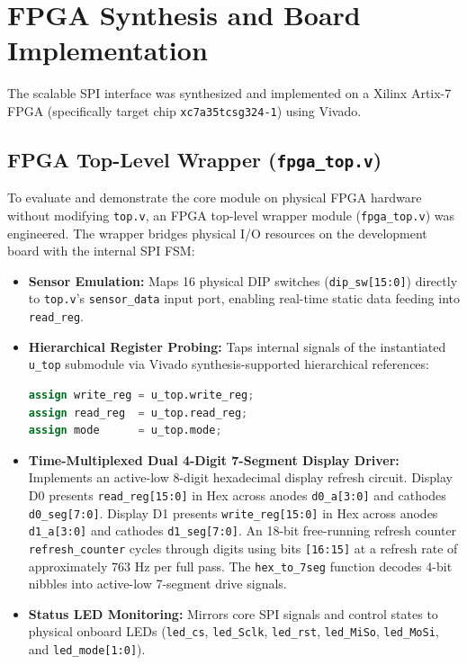 \documentclass[conference]{IEEEtran}
\begin{document}
\section{FPGA Synthesis and Board Implementation}
The scalable SPI interface was synthesized and implemented on a Xilinx Artix-7 FPGA (specifically target chip \texttt{xc7a35tcsg324-1}) using Vivado.

\subsection{FPGA Top-Level Wrapper (\texttt{fpga\_top.v})}
To evaluate and demonstrate the core module on physical FPGA hardware without modifying \texttt{top.v}, an FPGA top-level wrapper module (\texttt{fpga\_top.v}) was engineered. The wrapper bridges physical I/O resources on the development board with the internal SPI FSM:
\begin{itemize}
    \item \textbf{Sensor Emulation:} Maps 16 physical DIP switches (\texttt{dip\_sw[15:0]}) directly to \texttt{top.v}'s \texttt{sensor\_data} input port, enabling real-time static data feeding into \texttt{read\_reg}.
    \item \textbf{Hierarchical Register Probing:} Taps internal signals of the instantiated \texttt{u\_top} submodule via Vivado synthesis-supported hierarchical references:
    \begin{lstlisting}[language=Verilog]
assign write_reg = u_top.write_reg;
assign read_reg  = u_top.read_reg;
assign mode      = u_top.mode;
    \end{lstlisting}
    \item \textbf{Time-Multiplexed Dual 4-Digit 7-Segment Display Driver:} Implements an active-low 8-digit hexadecimal display refresh circuit. Display D0 presents \texttt{read\_reg[15:0]} in Hex across anodes \texttt{d0\_a[3:0]} and cathodes \texttt{d0\_seg[7:0]}. Display D1 presents \texttt{write\_reg[15:0]} in Hex across anodes \texttt{d1\_a[3:0]} and cathodes \texttt{d1\_seg[7:0]}. An 18-bit free-running refresh counter \texttt{refresh\_counter} cycles through digits using bits \texttt{[16:15]} at a refresh rate of approximately $763\text{ Hz}$ per full pass. The \texttt{hex\_to\_7seg} function decodes 4-bit nibbles into active-low 7-segment drive signals.
    \item \textbf{Status LED Monitoring:} Mirrors core SPI signals and control states to physical onboard LEDs (\texttt{led\_cs}, \texttt{led\_Sclk}, \texttt{led\_rst}, \texttt{led\_MiSo}, \texttt{led\_MoSi}, and \texttt{led\_mode[1:0]}).
\end{itemize}
\end{document}
